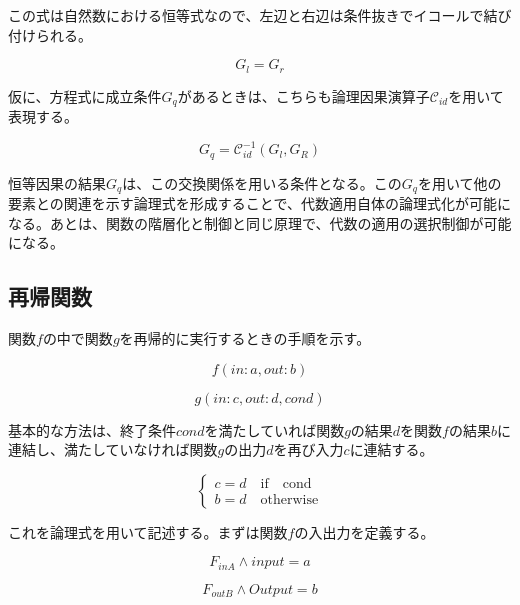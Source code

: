 \documentclass[12pt]{article}
\begin{document}
この式は自然数における恒等式なので、左辺と右辺は条件抜きでイコールで結び付けられる。

\begin{equation} G_l = G_r\end{equation}

仮に、方程式に成立条件\(G_q\)があるときは、こちらも論理因果演算子\(\mathcal{C}_{id}\)を用いて表現する。

\begin{equation} G_q=\mathcal{C}_{id}^{-1}(G_l,G_R)\end{equation}

恒等因果の結果\(G_q\)は、この交換関係を用いる条件となる。この\(G_q\)を用いて他の要素との関連を示す論理式を形成することで、代数適用自体の論理式化が可能になる。あとは、関数の階層化と制御と同じ原理で、代数の適用の選択制御が可能になる。

\subsection{再帰関数}\label{ux518dux5e30ux95a2ux6570}

関数\(f\)の中で関数\(g\)を再帰的に実行するときの手順を示す。

\begin{equation} f(in:a,out:b)\end{equation}

\begin{equation} g(in:c,out:d,cond)\end{equation}

基本的な方法は、終了条件\(cond\)を満たしていれば関数\(g\)の結果\(d\)を関数\(f\)の結果\(b\)に連結し、満たしていなければ関数\(g\)の出力\(d\)を再び入力\(c\)に連結する。

\begin{equation} \begin{cases} c=d \quad \text{if} \quad \text{cond}\\
 b=d \quad \text{otherwise}
 \end{cases}\end{equation}

これを論理式を用いて記述する。まずは関数\(f\)の入出力を定義する。

\begin{equation} F_{inA} \wedge input = a\end{equation}

\begin{equation} F_{outB} \wedge Output = b\end{equation}
\end{document}
